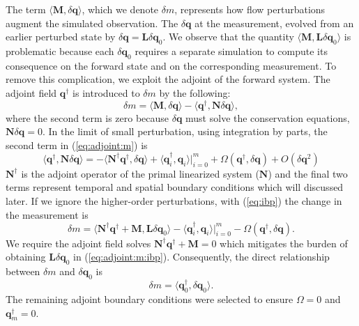 The term $\langle \mathbf{M}, \delta \mathbf{q} \rangle$, which we denote $\delta m$, represents how flow perturbations augment the simulated observation. 
The $\delta \mathbf{q}$ at the measurement, evolved from an earlier perturbed state by $\delta \mathbf{q} = \mathbf{L} \delta \mathbf{q}_0$. We observe that the quantity $\langle \mathbf{M}, \mathbf{L} \delta \mathbf{q}_0 \rangle$ is problematic because each $\delta \mathbf{q}_0$ requires a separate simulation to compute its consequence on the forward state and on the corresponding measurement. 
To remove this complication, we exploit the adjoint of the forward system. The adjoint field $\mathbf{q}^\dagger$ is introduced to $\delta m$ by the following:
\begin{equation}\label{eq:adjoint:m}
   \delta{m} =  \langle \mathbf{M},  \delta \mathbf{q}  \rangle - \langle \mathbf{q}^\dagger, \mathbf{N} \delta \mathbf{q}\rangle,
\end{equation}
where the second term is zero because $\delta \mathbf{q}$ must solve the conservation equations,~\mbox{$\mathbf{N}\delta\mathbf{q}=0$}. 
In the limit of small perturbation, using integration by parts, the second term in (\ref{eq:adjoint:m}) is 
\begin{equation}\label{eq:ibp}
\langle \mathbf{q}^\dagger, \mathbf{N} \delta \mathbf{q}\rangle = -\langle \mathbf{N}^\dagger\mathbf{q}^\dagger, \delta \mathbf{q}\rangle + \langle\mathbf{q}_i^\dagger,\mathbf{q}_i\rangle|_{i=0}^{m} + \Omega(\mathbf{q}^\dagger, \delta\mathbf{q}) + O(\delta \mathbf{q}^2)
\end{equation}
$\mathbf{N}^\dagger$ is the adjoint operator of the primal linearized system ($\mathbf{N}$) and the final two terms represent temporal and spatial boundary conditions which will discussed later. 
If we ignore the higher-order perturbations, with (\ref{eq:ibp}) the change in the measurement is
\begin{equation}\label{eq:adjoint:m:ibp}
   \delta m =  \langle \mathbf{N}^\dagger\mathbf{q}^\dagger+\mathbf{M},  \mathbf{L}\delta \mathbf{q}_0  \rangle -\langle\mathbf{q}_i^\dagger,\mathbf{q}_i\rangle|_{i=0}^{m} - \Omega(\mathbf{q}^\dagger, \delta \mathbf{q}).
\end{equation}
We require the adjoint field solves $\mathbf{N}^\dagger\mathbf{q}^\dagger+\mathbf{M}=0$ which mitigates the burden of obtaining $\mathbf{L}\delta \mathbf{q}_0$ in (\ref{eq:adjoint:m:ibp}). 
Consequently, the direct relationship between $\delta m$ and $\delta \mathbf{q}_0$ is
\begin{equation} \label{eq:dm:dqo}
    \delta m=\langle \mathbf{q}_0^\dagger, \delta \mathbf{q}_0\rangle.
\end{equation}
The remaining adjoint boundary conditions were selected to ensure $\Omega=0$ and $\mathbf{q}^\dagger_m=0$.  

